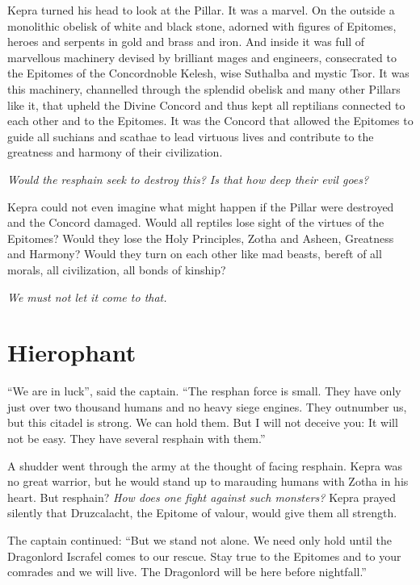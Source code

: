 \documentclass
  [a4paper,
   12pt,
   oneside
  ]%
  {article}
\begin{document}
Kepra turned his head to look at the Pillar. It was a marvel. On the outside a monolithic obelisk of white and black stone, adorned with figures of Epitomes, heroes and serpents in gold and brass and iron. And inside it was full of marvellous machinery devised by brilliant mages and engineers, consecrated to the Epitomes of the Concord\dash{}noble Kelesh, wise Suthalba and mystic Tsor. It was this machinery, channelled through the splendid obelisk and many other Pillars like it, that upheld the Divine Concord and thus kept all reptilians connected to each other and to the Epitomes. It was the Concord that allowed the Epitomes to guide all suchians and scathae to lead virtuous lives and contribute to the greatness and harmony of their civilization.

\emph{Would the resphain seek to destroy this? Is that how deep their evil goes?}

Kepra could not even imagine what might happen if the Pillar were destroyed and the Concord damaged. Would all reptiles lose sight of the virtues of the Epitomes? Would they lose the Holy Principles, Zotha and Asheen, Greatness and Harmony? Would they turn on each other like mad beasts, bereft of all morals, all civilization, all bonds of kinship?

\emph{
    We must not let it come to that.%
     }



\section{Hierophant}
``We are in luck'', said the captain. ``The resphan force is small. They have only just over two thousand humans and no heavy siege engines. They outnumber us, but this citadel is strong. We can hold them. But I will not deceive you: It will not be easy. They have several resphain with them.'' 

A shudder went through the army at the thought of facing resphain. Kepra was no great warrior, but he would stand up to marauding humans with Zotha in his heart. 
But resphain? 
\emph{How does one fight against such monsters?}
Kepra prayed silently that Druzcalacht, the Epitome of valour, would give them all strength.

The captain continued: ``But we stand not alone. We need only hold until the Dragonlord Iscrafel comes to our rescue. Stay true to the Epitomes and to your comrades and we will live. The Dragonlord will be here before nightfall.''
\end{document}
